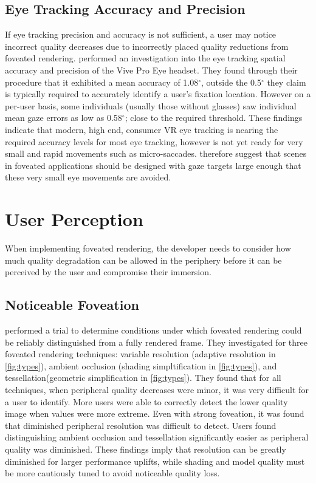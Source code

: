 \documentclass[a4paper,11pt]{article}
\begin{document}
\subsection{Eye Tracking Accuracy and Precision}
\label{tracking_precision}
If eye tracking precision and accuracy is not sufficient, a user may notice incorrect quality decreases due to incorrectly placed quality reductions from foveated rendering. \textcite{schuetz2022eye} performed an investigation into the eye tracking spatial accuracy and precision of the Vive Pro Eye headset. They found through their procedure that it exhibited a mean accuracy of 1.08$^{\circ}$, outside the 0.5$^{\circ}$ they claim is typically required to accurately identify a user's fixation location. However on a per-user basis, some individuals (usually those without glasses) saw individual mean gaze errors as low as 0.58$^{\circ}$; close to the required threshold. These findings indicate that modern, high end, consumer VR eye tracking is nearing the required accuracy levels for most eye tracking, however is not yet ready for very small and rapid movements such as micro-saccades. \textcite{schuetz2022eye} therefore suggest that scenes in foveated applications should be designed with gaze targets large enough that these very small eye movements are avoided.

\section{User Perception}
When implementing foveated rendering, the developer needs to consider how much quality degradation can be allowed in the periphery before it can be perceived by the user and compromise their immersion.
\subsection{Noticeable Foveation}
\label{noticeable}
\textcite{swafford2016user} performed a trial to determine conditions under which foveated rendering could be reliably distinguished from a fully rendered frame. They investigated for three foveated rendering techniques: variable resolution (adaptive resolution in \cref{fig:types}), ambient occlusion (shading simpltification in \cref{fig:types}), and tessellation(geometric simplification in \cref{fig:types}). They found that for all techniques, when peripheral quality decreases were minor, it was very difficult for a user to identify. More users were able to correctly detect the lower quality image when values were more extreme. Even with strong foveation, it was found that diminished peripheral resolution was difficult to detect. Users found distinguishing ambient occlusion and tessellation significantly easier as peripheral quality was diminished. These findings imply that resolution can be greatly diminished for larger performance uplifts, while shading and model quality must be more cautiously tuned to avoid noticeable quality loss.
\end{document}
